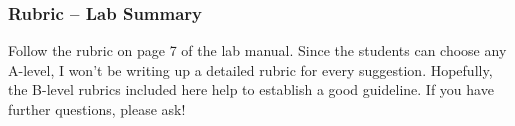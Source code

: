 \documentclass[fleqn,letterpaper]{article}
\begin{document}
\subsubsection*{Rubric -- Lab Summary}

Follow the rubric on page 7 of the lab manual.  Since the students can choose any A-level, I won't be writing up a detailed rubric for every suggestion.  Hopefully, the B-level rubrics included here help to establish a good guideline.  If you have further questions, please ask!

\label{LastPage}
\end{document}
